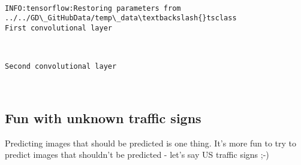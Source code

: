 \documentclass[11pt]{article}
\begin{document}
    \begin{center}
    \end{center}
    { \hspace*{\fill} \\}
    
    \begin{Verbatim}[commandchars=\\\{\}]
INFO:tensorflow:Restoring parameters from ../../GD\_GitHubData/temp\_data\textbackslash{}tsclass
First convolutional layer

    \end{Verbatim}

    \begin{center}
    \end{center}
    { \hspace*{\fill} \\}
    
    \begin{Verbatim}[commandchars=\\\{\}]
Second convolutional layer

    \end{Verbatim}

    \begin{center}
    \end{center}
    { \hspace*{\fill} \\}
    
    \subsection{Fun with unknown traffic
signs}\label{fun-with-unknown-traffic-signs}

    Predicting images that should be predicted is one thing. It's more fun
to try to predict images that shouldn't be predicted - let's say US
traffic signs ;-)
\end{document}
